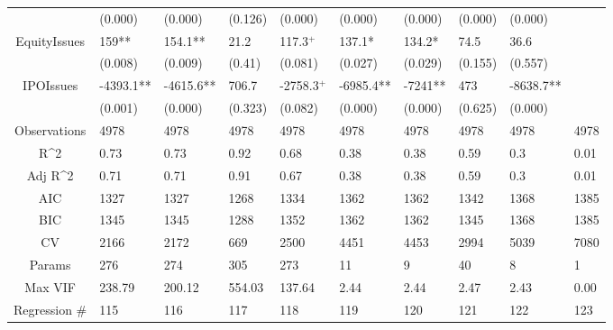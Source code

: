 \documentclass{article}
\begin{document}
\begin{table}[H]
\begin{tabular}{|clllllllll|}
   & (0.000) & (0.000) & (0.126) & (0.000) & (0.000) & (0.000) & (0.000) & (0.000) &  \\ 
  EquityIssues & 159** & 154.1** & 21.2 & 117.3$^{+}$ & 137.1* & 134.2* & 74.5 & 36.6 &  \\ 
   & (0.008) & (0.009) & (0.41) & (0.081) & (0.027) & (0.029) & (0.155) & (0.557) &  \\ 
  IPOIssues & -4393.1** & -4615.6** & 706.7 & -2758.3$^{+}$ & -6985.4** & -7241** & 473 & -8638.7** &  \\ 
   & (0.001) & (0.000) & (0.323) & (0.082) & (0.000) & (0.000) & (0.625) & (0.000) &  \\ 
  \hline 
 Observations & 4978 & 4978 & 4978 & 4978 & 4978 & 4978 & 4978 & 4978 & 4978 \\ 
  R^2 & 0.73 & 0.73 & 0.92 & 0.68 & 0.38 & 0.38 & 0.59 & 0.3 & 0.01 \\ 
  Adj R^2 & 0.71 & 0.71 & 0.91 & 0.67 & 0.38 & 0.38 & 0.59 & 0.3 & 0.01 \\ 
  AIC & 1327 & 1327 & 1268 & 1334 & 1362 & 1362 & 1342 & 1368 & 1385 \\ 
  BIC & 1345 & 1345 & 1288 & 1352 & 1362 & 1362 & 1345 & 1368 & 1385 \\ 
  CV & 2166 & 2172 & 669 & 2500 & 4451 & 4453 & 2994 & 5039 & 7080 \\ 
  Params & 276 & 274 & 305 & 273 & 11 & 9 & 40 & 8 & 1 \\ 
  Max VIF & 238.79 & 200.12 & 554.03 & 137.64 & 2.44 & 2.44 & 2.47 & 2.43 & 0.00 \\ 
  Regression \# & 115 & 116 & 117 & 118 & 119 & 120 & 121 & 122 & 123 \\ 
   \hline
\end{tabular}
 
\end{table}
\end{document}
